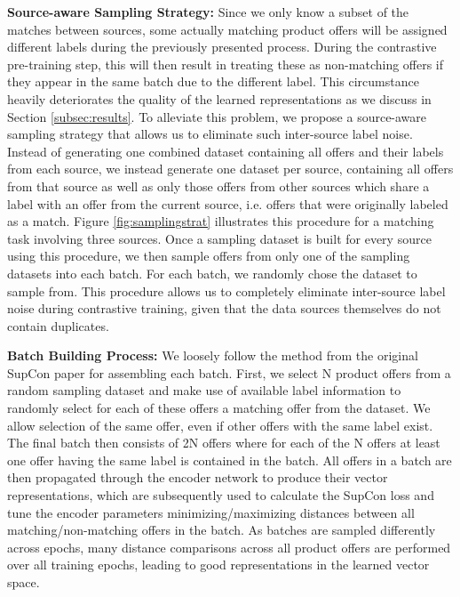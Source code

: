 \documentclass[sigconf]{acmart}
\begin{document}
\textbf{Source-aware Sampling Strategy:} Since we only know a subset of the matches between sources, some actually matching product offers will be assigned different labels during the previously presented process. During the contrastive pre-training step, this will then result in treating these as non-matching offers if they appear in the same batch due to the different label. This circumstance heavily deteriorates the quality of the learned representations as we discuss in Section \ref{subsec:results}. To alleviate this problem, we propose a source-aware sampling strategy that allows us to eliminate such inter-source label noise. Instead of generating one combined dataset containing all offers and their labels from each source, we instead generate one dataset per source, containing all offers from that source as well as only those offers from other sources which share a label with an offer from the current source, i.e. offers that were originally labeled as a match. Figure \ref{fig:samplingstrat} illustrates this procedure for a matching task involving three sources. 
Once a sampling dataset is built for every source using this procedure, we then sample offers from only one of the sampling datasets into each batch. For each batch, we randomly chose the dataset to sample from. This procedure allows us to completely eliminate inter-source label noise during contrastive training, given that the data sources themselves do not contain duplicates. 


\textbf{Batch Building Process:} We loosely follow the method from the original SupCon paper for assembling each batch. First, we select N product offers from a random sampling dataset and make use of available label information to randomly select for each of these offers a matching offer from the dataset. We allow selection of the same offer, even if other offers with the same label exist. The final batch then consists of 2N offers where for each of the N offers at least one offer having the same label is contained in the batch. All offers in a batch are then propagated through the encoder network to produce their vector representations, which are subsequently used to calculate the SupCon loss and tune the encoder parameters minimizing/maximizing distances between all matching/non-matching offers in the batch. 
As batches are sampled differently across epochs, many distance comparisons across all product offers are performed over all training epochs, leading to good representations in the learned vector space.
\end{document}
